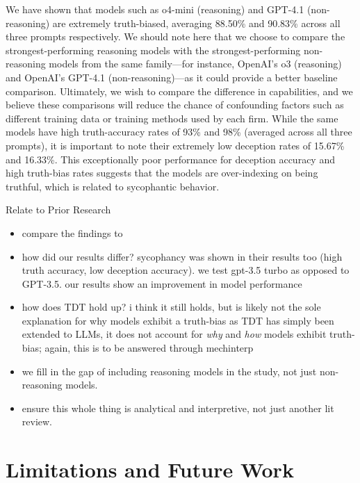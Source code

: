 \documentclass{article}
\begin{document}
We have shown that models such as o4-mini (reasoning) and GPT-4.1 (non-reasoning) are extremely truth-biased, averaging 88.50\% and 90.83\% across all three prompts respectively. We should note here that we choose to compare the strongest-performing reasoning models with the strongest-performing non-reasoning models from the same family---for instance, OpenAI's o3 (reasoning) and OpenAI's GPT-4.1 (non-reasoning)---as it could provide a better baseline comparison. Ultimately, we wish to compare the difference in capabilities, and we believe these comparisons will reduce the chance of confounding factors such as different training data or training methods used by each firm. While the same models have high truth-accuracy rates of 93\% and 98\% (averaged across all three prompts), it is important to note their extremely low deception rates of 15.67\% and 16.33\%. This exceptionally poor performance for deception accuracy and high truth-bias rates suggests that the models are over-indexing on being truthful, which is related to sycophantic behavior.

Relate to Prior Research
\begin{itemize}
    \item compare the findings to \citep{markowitz_generative_2024}
    \item how did our results differ? sycophancy was shown in their results too (high truth accuracy, low deception accuracy). we test gpt-3.5 turbo as opposed to GPT-3.5. our results show an improvement in model performance
    \item how does TDT hold up? i think it still holds, but is likely not the sole explanation for why models exhibit a truth-bias as TDT has simply been extended to LLMs, it does not account for \textit{why} and \textit{how} models exhibit truth-bias; again, this is to be answered through mechinterp
    \item we fill in the gap of including reasoning models in the study, not just non-reasoning models.
    \item ensure this whole thing is analytical and interpretive, not just another lit review.
\end{itemize}

\section{Limitations and Future Work}
\label{sec:limitations}
\end{document}
